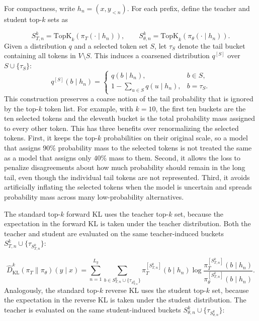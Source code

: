 For compactness, write $h_n = (x, y_{<n})$. For each prefix, define the teacher and student top-$k$ sets as

\begin{equation}
S_{T,n}^{k}
= \mathrm{TopK}_{k}\left(\pi_T(\cdot \mid h_n)\right),
\qquad
S_{\theta,n}^{k}
= \mathrm{TopK}_{k}\left(\pi_\theta(\cdot \mid h_n)\right).
\label{eq:topk_sets}
\end{equation}
%
Given a distribution $q$ and a selected token set $S$, let $\tau_S$ denote the tail bucket containing all tokens in $V \setminus S$. This induces a coarsened distribution $q^{[S]}$ over $S \cup \{\tau_S\}$:
%
\begin{equation}
q^{[S]}(b \mid h_n)
=
\left\{
\begin{array}{ll}
q(b \mid h_n), & b \in S, \\
1 - \sum_{u \in S} q(u \mid h_n), & b = \tau_S.
\end{array}
\right.
\label{eq:tail_bucket_distribution}
\end{equation}
%
This construction preserves a coarse notion of the tail probability that is ignored by the top-$k$ token list. For example, with $k=10$, the first ten buckets are the ten selected tokens and the eleventh bucket is the total probability mass assigned to every other token. This has three benefits over renormalizing the selected tokens. First, it keeps the top-$k$ probabilities on their original scale, so a model that assigns $90\%$ probability mass to the selected tokens is not treated the same as a model that assigns only $40\%$ mass to them. Second, it allows the loss to penalize disagreements about how much probability should remain in the long tail, even though the individual tail tokens are not represented. Third, it avoids artificially inflating the selected tokens when the model is uncertain and spreads probability mass across many low-probability alternatives.

The standard top-$k$ forward KL uses the teacher top-$k$ set, because the expectation in the forward KL is taken under the teacher distribution. Both the teacher and student are evaluated on the same teacher-induced buckets $S_{T,n}^{k} \cup \{\tau_{S_{T,n}^{k}}\}$:

\begin{equation}
\widehat{D}_{\mathrm{KL}}^{k}
(\pi_T \| \pi_\theta)(y \mid x)
=
\sum_{n=1}^{L_y}
\sum_{b \in S_{T,n}^{k} \cup \{\tau_{S_{T,n}^{k}}\}}
\pi_T^{[S_{T,n}^{k}]}(b \mid h_n)
\log
\frac{\pi_T^{[S_{T,n}^{k}]}(b \mid h_n)}
{\pi_\theta^{[S_{T,n}^{k}]}(b \mid h_n)}.
\label{eq:topk_forward_kl}
\end{equation}
%
Analogously, the standard top-$k$ reverse KL uses the student top-$k$ set, because the expectation in the reverse KL is taken under the student distribution. The teacher is evaluated on the same student-induced buckets $S_{\theta,n}^{k} \cup \{\tau_{S_{\theta,n}^{k}}\}$:

